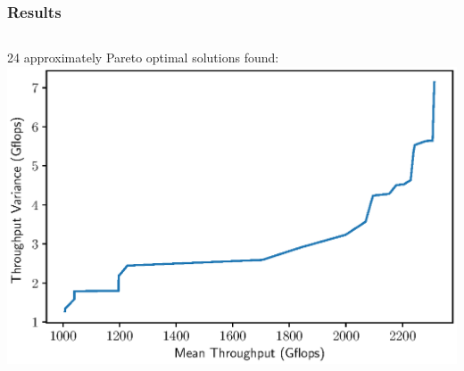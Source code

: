 \documentclass[aspectratio=169]{beamer}
\begin{document}
\begin{frame}\frametitle{Results}
	\begin{columns}
		\begin{column}{0.4\textwidth}
			24 approximately Pareto optimal solutions found:\\
			\includegraphics[width=1.1\textwidth]{hpl_n20k_pf.eps}\\

			\medskip


\end{column}
\end{columns}
\end{frame}
\end{document}
